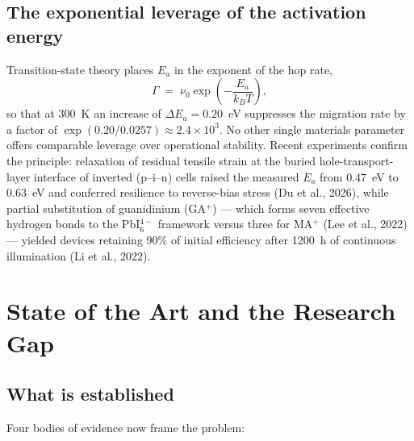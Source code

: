 \documentclass[11pt,a4paper]{article}
\begin{document}
\subsection{The exponential leverage of the activation energy}
Transition-state theory places $E_a$ in the exponent of the hop rate,
\begin{equation}
\Gamma \;=\; \nu_0 \exp\!\left(-\frac{E_a}{k_B T}\right),
\end{equation}
so that at 300~K an increase of $\Delta E_a = 0.20$~eV suppresses the migration rate by
a factor of $\exp(0.20/0.0257)\approx 2.4\times10^{3}$. No other single materials
parameter offers comparable leverage over operational stability. Recent experiments
confirm the principle: relaxation of residual tensile strain at the buried
hole-transport-layer interface of inverted (p--i--n) cells raised the measured $E_a$
from 0.47~eV to 0.63~eV and conferred resilience to reverse-bias stress (Du et al.,
2026), while partial substitution of guanidinium (GA$^+$) --- which forms seven
effective hydrogen bonds to the PbI$_6^{4-}$ framework versus three for MA$^+$ (Lee et
al., 2022) --- yielded devices retaining 90\% of initial efficiency after 1200~h of
continuous illumination (Li et al., 2022).

\section{State of the Art and the Research Gap}

\subsection{What is established}
Four bodies of evidence now frame the problem:
\end{document}
